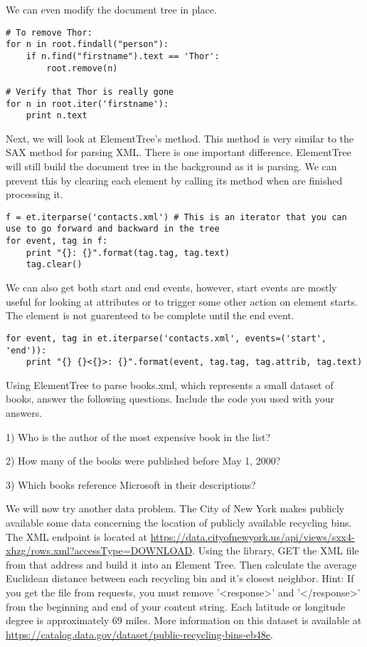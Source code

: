 We can even modify the document tree in place.
\begin{lstlisting}
# To remove Thor:
for n in root.findall("person"):
    if n.find("firstname").text == 'Thor':
        root.remove(n)

# Verify that Thor is really gone
for n in root.iter('firstname'):
    print n.text
\end{lstlisting}

Next, we will look at ElementTree's  method.
This method is very similar to the SAX method for parsing XML.
There is one important difference.
ElementTree will still build the document tree in the background as it is parsing.
We can prevent this by clearing each element by calling its  method when are finished processing it.
\begin{lstlisting}
f = et.iterparse('contacts.xml') # This is an iterator that you can use to go forward and backward in the tree
for event, tag in f:
    print "{}: {}".format(tag.tag, tag.text)
    tag.clear()
\end{lstlisting}

We can also get both start and end events, however, start events are mostly useful for looking at attributes or to trigger some other action on element starts.
The element is not guarenteed to be complete until the end event.
\begin{lstlisting}
for event, tag in et.iterparse('contacts.xml', events=('start', 'end')):
    print "{} {}<{}>: {}".format(event, tag.tag, tag.attrib, tag.text)
\end{lstlisting}

\begin{problem}
Using ElementTree to parse books.xml, which represents a small dataset of books, answer the following questions. Include the code you used with your answers.

1) Who is the author of the most expensive book in the list?

2) How many of the books were published before May 1, 2000?

3) Which books reference Microsoft in their descriptions?
\end{problem}

\begin{problem}
We will now try another data problem. The City of New York makes publicly available some data concerning the location of publicly available recycling bins. The XML endpoint is located at \url{https://data.cityofnewyork.us/api/views/sxx4-xhzg/rows.xml?accessType=DOWNLOAD}. Using the  library, GET the XML file from that address and build it into an Element Tree. Then calculate the average Euclidean distance between each recycling bin and it's closest neighbor. Hint: If you get the file from requests, you must remove '<response>' and '</response>' from the beginning and end of your content string. Each latitude or longitude degree is approximately 69 miles. More information on this dataset is available at \url{https://catalog.data.gov/dataset/public-recycling-bins-eb48e}.
\end{problem}


